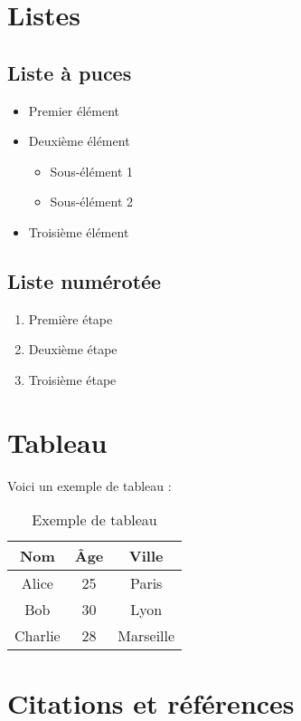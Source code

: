 \documentclass[12pt,a4paper]{article}
\begin{document}
\section{Listes}

\subsection{Liste à puces}
\begin{itemize}
    \item Premier élément
    \item Deuxième élément
    \begin{itemize}
        \item Sous-élément 1
        \item Sous-élément 2
    \end{itemize}
    \item Troisième élément
\end{itemize}

\subsection{Liste numérotée}
\begin{enumerate}
    \item Première étape
    \item Deuxième étape
    \item Troisième étape
\end{enumerate}

\section{Tableau}

Voici un exemple de tableau :

\begin{table}[h]
\centering
\begin{tabular}{|c|c|c|}
\hline
Nom & Âge & Ville \\
\hline
Alice & 25 & Paris \\
Bob & 30 & Lyon \\
Charlie & 28 & Marseille \\
\hline
\end{tabular}
\caption{Exemple de tableau}
\label{tab:exemple}
\end{table}

\section{Citations et références}
\end{document}
